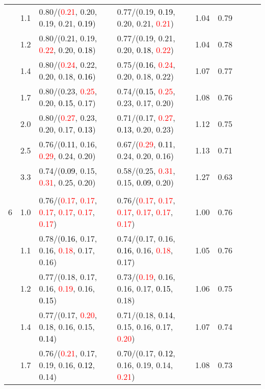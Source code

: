 \documentclass[10pt,a4paper]{report}
\begin{document}
\begin{table}[!htbp]
\begin{center}
{\begin{tabular}{ccllccccc}
			&1.1&0.80/(\textcolor{red}{0.21}, 0.20, 0.19, 0.21, \textcolor{black}{0.19})&0.77/(0.19, \textcolor{black}{0.19}, 0.20, 0.21, \textcolor{red}{0.21})&1.04&0.79\\
			&1.2&0.80/(0.21, 0.19, \textcolor{red}{0.22}, 0.20, \textcolor{black}{0.18})&0.77/(0.19, 0.21, 0.20, \textcolor{black}{0.18}, \textcolor{red}{0.22})&1.04&0.78\\
			&1.4&0.80/(\textcolor{red}{0.24}, 0.22, 0.20, 0.18, \textcolor{black}{0.16})&0.75/(\textcolor{black}{0.16}, \textcolor{red}{0.24}, 0.20, 0.18, 0.22)&1.07&0.77\\
			&1.7&0.80/(0.23, \textcolor{red}{0.25}, 0.20, \textcolor{black}{0.15}, 0.17)&0.74/(\textcolor{black}{0.15}, \textcolor{red}{0.25}, 0.23, 0.17, 0.20)&1.08&0.76\\
			&2.0&0.80/(\textcolor{red}{0.27}, 0.23, 0.20, 0.17, \textcolor{black}{0.13})&0.71/(0.17, \textcolor{red}{0.27}, \textcolor{black}{0.13}, 0.20, 0.23)&1.12&0.75\\
			&2.5&0.76/(\textcolor{black}{0.11}, 0.16, \textcolor{red}{0.29}, 0.24, 0.20)&0.67/(\textcolor{red}{0.29}, \textcolor{black}{0.11}, 0.24, 0.20, 0.16)&1.13&0.71\\
			&3.3&0.74/(\textcolor{black}{0.09}, 0.15, \textcolor{red}{0.31}, 0.25, 0.20)&0.58/(0.25, \textcolor{red}{0.31}, 0.15, \textcolor{black}{0.09}, 0.20)&1.27&0.63\\
			&&&&\\
			6			&1.0&0.76/(\textcolor{red}{0.17}, \textcolor{red}{0.17}, \textcolor{red}{0.17}, \textcolor{red}{0.17}, \textcolor{red}{0.17}, \textcolor{red}{0.17})&0.76/(\textcolor{red}{0.17}, \textcolor{red}{0.17}, \textcolor{red}{0.17}, \textcolor{red}{0.17}, \textcolor{red}{0.17}, \textcolor{red}{0.17})&1.00&0.76\\
			&1.1&0.78/(\textcolor{black}{0.16}, 0.17, 0.16, \textcolor{red}{0.18}, 0.17, 0.16)&0.74/(0.17, 0.16, \textcolor{black}{0.16}, 0.16, \textcolor{red}{0.18}, 0.17)&1.05&0.76\\
			&1.2&0.77/(0.18, 0.17, 0.16, \textcolor{red}{0.19}, 0.16, \textcolor{black}{0.15})&0.73/(\textcolor{red}{0.19}, 0.16, 0.16, 0.17, \textcolor{black}{0.15}, 0.18)&1.06&0.75\\
			&1.4&0.77/(0.17, \textcolor{red}{0.20}, 0.18, 0.16, 0.15, \textcolor{black}{0.14})&0.71/(0.18, \textcolor{black}{0.14}, 0.15, 0.16, 0.17, \textcolor{red}{0.20})&1.07&0.74\\
			&1.7&0.76/(\textcolor{red}{0.21}, 0.17, 0.19, 0.16, \textcolor{black}{0.12}, 0.14)&0.70/(0.17, \textcolor{black}{0.12}, 0.16, 0.19, 0.14, \textcolor{red}{0.21})&1.08&0.73\\

\end{tabular}}
\end{center}
\end{table}
\end{document}
